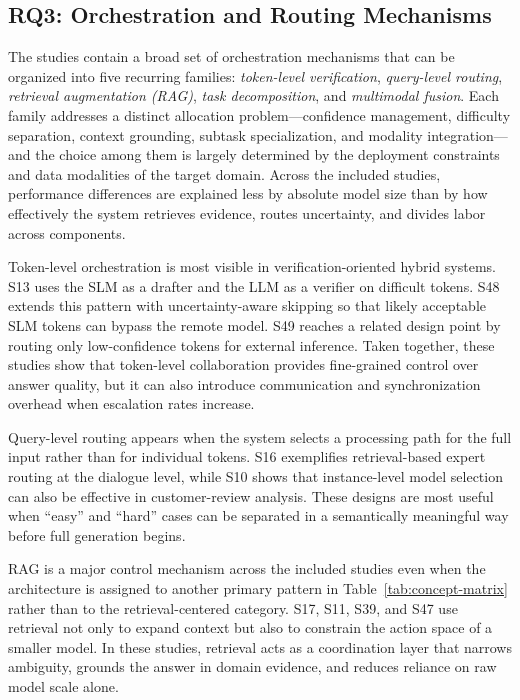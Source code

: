 \subsection{RQ3: Orchestration and Routing Mechanisms}
\label{sec:rq3}
The studies contain a broad set of orchestration mechanisms that can be organized into five recurring families: \textit{token-level verification}, \textit{query-level routing}, \textit{retrieval augmentation (RAG)}, \textit{task decomposition}, and \textit{multimodal fusion}. Each family addresses a distinct allocation problem---confidence management, difficulty separation, context grounding, subtask specialization, and modality integration---and the choice among them is largely determined by the deployment constraints and data modalities of the target domain. Across the included studies, performance differences are explained less by absolute model size than by how effectively the system retrieves evidence, routes uncertainty, and divides labor across components.

Token-level orchestration is most visible in verification-oriented hybrid systems. S13 uses the SLM as a drafter and the LLM as a verifier on difficult tokens. S48 extends this pattern with uncertainty-aware skipping so that likely acceptable SLM tokens can bypass the remote model. S49 reaches a related design point by routing only low-confidence tokens for external inference. Taken together, these studies show that token-level collaboration provides fine-grained control over answer quality, but it can also introduce communication and synchronization overhead when escalation rates increase.

Query-level routing appears when the system selects a processing path for the full input rather than for individual tokens. S16 exemplifies retrieval-based expert routing at the dialogue level, while S10 shows that instance-level model selection can also be effective in customer-review analysis. These designs are most useful when ``easy'' and ``hard'' cases can be separated in a semantically meaningful way before full generation begins.

RAG is a major control mechanism across the included studies even when the architecture is assigned to another primary pattern in Table~\ref{tab:concept-matrix} rather than to the retrieval-centered category. S17, S11, S39, and S47 use retrieval not only to expand context but also to constrain the action space of a smaller model. In these studies, retrieval acts as a coordination layer that narrows ambiguity, grounds the answer in domain evidence, and reduces reliance on raw model scale alone.

